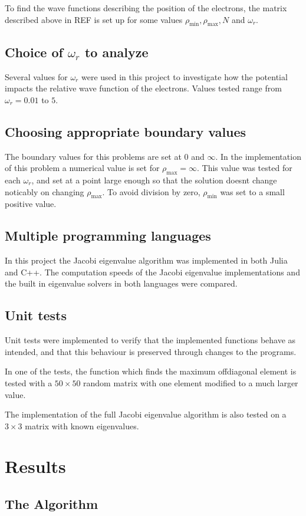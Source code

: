 \documentclass[aps,reprint]{revtex4-1}
\begin{document}
To find the wave functions describing the position of the electrons, the matrix
described above in REF is set up for some values \(\rho_{\text{min}},
\rho_{\text{max}}, N\) and \(\omega_{r}\).
\subsection{Choice of $\omega_r$ to analyze}
Several values for $\omega_r$ were used in this project to investigate how the
potential impacts the relative wave function of the electrons. Values tested range
from $\omega_r = 0.01$ to $5$.
\subsection{Choosing appropriate boundary values}
The boundary values for this problems are set at $0$ and \(\infty\). In the
implementation of this problem a numerical value is set for $\rho_\text{max} = \infty$.
This value was tested for each $\omega_r$, and set at a point large enough
so that the solution doesnt change noticably on changing $\rho_\text{max}$.
To avoid division by zero, $\rho_\text{min}$ was set to a small positive value.
\subsection{Multiple programming languages}
In this project the Jacobi eigenvalue algorithm was implemented in both Julia and
C++. The computation speeds of the Jacobi eigenvalue implementations
and the built in eigenvalue solvers in both languages were compared.
\subsection{Unit tests}
Unit tests were implemented to verify that the implemented functions behave
as intended, and that this behaviour is preserved through changes to the programs.

In one of the tests, the function which finds the maximum offdiagonal element
is tested with a $50 \times 50$ random matrix with one element modified to a
much larger value.

The implementation of the full Jacobi eigenvalue algorithm is also tested on a
$3 \times 3$ matrix with known eigenvalues.
\section{Results}
\label{sec:results}

\subsection{The Algorithm}
\label{sec:algorithm}
\end{document}
